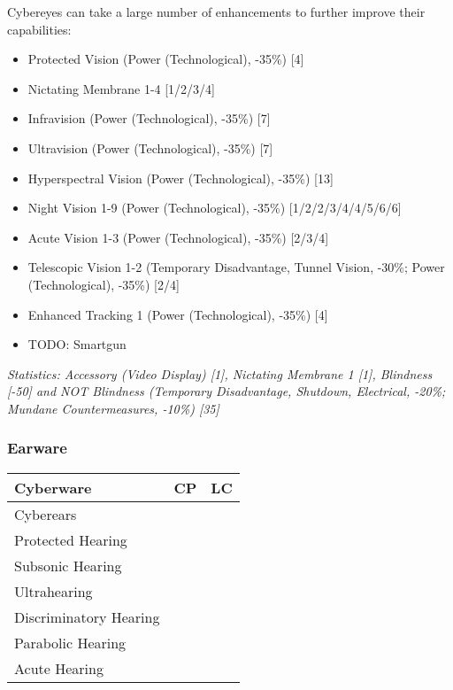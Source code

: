\begin{multicols*}{3}
	Cybereyes can take a large number of enhancements to further improve their capabilities: 
	
	\begin{itemize}
		\item Protected Vision (Power (Technological), -35\%) [4]
		\item Nictating Membrane 1-4 [1/2/3/4]
		\item Infravision (Power (Technological), -35\%) [7]
		\item Ultravision (Power (Technological), -35\%) [7]
		\item Hyperspectral Vision (Power (Technological), -35\%) [13]
		\item Night Vision 1-9 (Power (Technological), -35\%) [1/2/2/3/4/4/5/6/6]
		\item Acute Vision 1-3 (Power (Technological), -35\%) [2/3/4]
		\item Telescopic Vision 1-2 (Temporary Disadvantage, Tunnel Vision, -30\%; Power (Technological), -35\%) [2/4]
		\item Enhanced Tracking 1 (Power (Technological), -35\%) [4]
		\item TODO: Smartgun
	\end{itemize}
	
	\textit{\textcolor{OliveGreen}{Statistics: Accessory (Video Display) [1], Nictating Membrane 1 [1], Blindness [-50] and NOT Blindness (Temporary Disadvantage, Shutdown, Electrical, -20\%; Mundane Countermeasures, -10\%) [35]}}
	
	\subsubsection{Earware}
	
	\begin{center}
		\begin{tabularx}{0.32\textwidth}{|X|c|c|}
			\hline
			Cyberware & CP & LC\\
			\hline
			\hline
			Cyberears & & \\
			\hline
			Protected Hearing & & \\
			Subsonic Hearing & & \\
			Ultrahearing & & \\
			Discriminatory Hearing & & \\
			Parabolic Hearing & & \\
			Acute Hearing & & \\
			\hline
		\end{tabularx}
	\end{center}
	

\end{multicols*}
